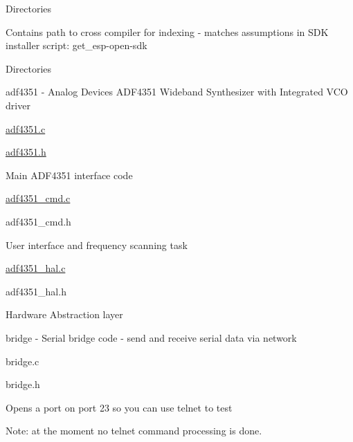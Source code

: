 \begin{DoxyParagraph}{Directories}
\begin{DoxyItemize}
\begin{DoxyItemize}
\begin{DoxyItemize}
\begin{DoxyItemize}
\item Contains path to cross compiler for indexing -\/ matches assumptions in S\+DK installer script\+: get\+\_\+esp-\/open-\/sdk
\end{DoxyItemize}
\end{DoxyItemize}
\end{DoxyItemize}
\item Directories
\begin{DoxyItemize}
\item adf4351 -\/ Analog Devices A\+D\+F4351 Wideband Synthesizer with Integrated V\+CO driver
\begin{DoxyItemize}
\item \hyperlink{adf4351_8c}{adf4351.\+c}
\item \hyperlink{adf4351_8h}{adf4351.\+h}
\begin{DoxyItemize}
\item Main A\+D\+F4351 interface code
\end{DoxyItemize}
\item \hyperlink{adf4351__cmd_8c}{adf4351\+\_\+cmd.\+c}
\item adf4351\+\_\+cmd.\+h
\begin{DoxyItemize}
\item User interface and frequency scanning task
\end{DoxyItemize}
\item \hyperlink{adf4351__hal_8c}{adf4351\+\_\+hal.\+c}
\item adf4351\+\_\+hal.\+h
\begin{DoxyItemize}
\item Hardware Abstraction layer
\end{DoxyItemize}
\end{DoxyItemize}
\item bridge -\/ Serial bridge code -\/ send and receive serial data via network
\begin{DoxyItemize}
\item bridge.\+c
\item bridge.\+h
\begin{DoxyItemize}
\item Opens a port on port 23 so you can use telnet to test
\begin{DoxyItemize}
\item Note\+: at the moment no telnet command processing is done.
\end{DoxyItemize}
\end{DoxyItemize}
\end{DoxyItemize}
\end{DoxyItemize}
\end{DoxyItemize}
\end{DoxyParagraph}

